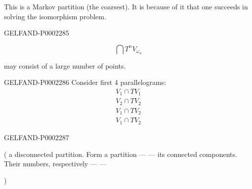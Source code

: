 This is a Markov partition (the coarsest).
It is because of it that one succeeds in solving the isomorphism problem.



\begin{GelfandAdjacentEvidence}{GELFAND-P000228}{5}

\begin{equation*}
 \bigcap T^n V_{\omega_n}
\end{equation*}


may consist of a large number of points.
\end{GelfandAdjacentEvidence}

\begin{GelfandAdjacentEvidence}{GELFAND-P000228}{6}
Consider first 4 parallelograms:
\begin{gather*}
 V_1\cap TV_1\\
 V_2\cap TV_2\\
 V_1\cap TV_2\\
 V_1\cap TV_2
\end{gather*}



\end{GelfandAdjacentEvidence}




\begin{GelfandAdjacentEvidence}{GELFAND-P000228}{7}

(
 a disconnected partition. Form a partition —
— its connected components. Their numbers, respectively —
— 

)
\end{GelfandAdjacentEvidence}





